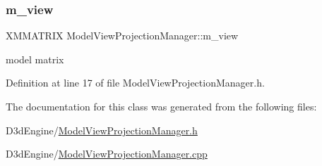 \subsubsection{\texorpdfstring{m\+\_\+view}{m\_view}}
{\footnotesize\ttfamily X\+M\+M\+A\+T\+R\+IX Model\+View\+Projection\+Manager\+::m\+\_\+view\hspace{0.3cm}{\ttfamily [private]}}



model matrix 



Definition at line 17 of file Model\+View\+Projection\+Manager.\+h.



The documentation for this class was generated from the following files\+:\begin{DoxyCompactItemize}
\item 
D3d\+Engine/\mbox{\hyperlink{_model_view_projection_manager_8h}{Model\+View\+Projection\+Manager.\+h}}\item 
D3d\+Engine/\mbox{\hyperlink{_model_view_projection_manager_8cpp}{Model\+View\+Projection\+Manager.\+cpp}}\end{DoxyCompactItemize}
